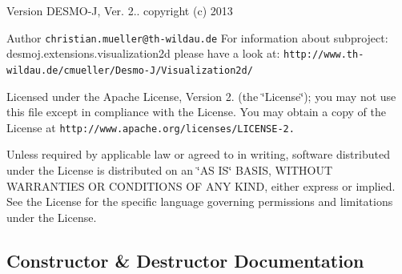 \begin{DoxyVersion}{Version}
D\-E\-S\-M\-O-\/\-J, Ver. 2.. copyright (c) 2013 
\end{DoxyVersion}
\begin{DoxyAuthor}{Author}
{\tt christian.\-mueller@th-\/wildau.\-de} For information about subproject\-: desmoj.\-extensions.\-visualization2d please have a look at\-: {\tt http\-://www.\-th-\/wildau.\-de/cmueller/\-Desmo-\/\-J/\-Visualization2d/}
\end{DoxyAuthor}
Licensed under the Apache License, Version 2. (the \char`\"{}\-License\char`\"{}); you may not use this file except in compliance with the License. You may obtain a copy of the License at {\tt http\-://www.\-apache.\-org/licenses/\-L\-I\-C\-E\-N\-S\-E-\/2.}

Unless required by applicable law or agreed to in writing, software distributed under the License is distributed on an \char`\"{}\-A\-S I\-S\char`\"{} B\-A\-S\-I\-S, W\-I\-T\-H\-O\-U\-T W\-A\-R\-R\-A\-N\-T\-I\-E\-S O\-R C\-O\-N\-D\-I\-T\-I\-O\-N\-S O\-F A\-N\-Y K\-I\-N\-D, either express or implied. See the License for the specific language governing permissions and limitations under the License. 

\subsection{Constructor \& Destructor Documentation}
